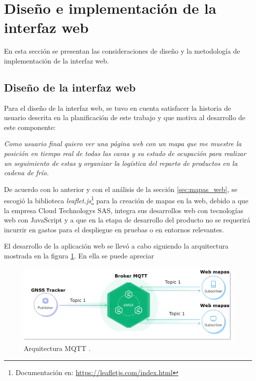 \section{Diseño e implementación de la interfaz web}

En esta sección se presentan las consideraciones de diseño y la metodología de implementación de la interfaz web.

\subsection{Diseño de la interfaz web}

Para el diseño de la interfaz web, se tuvo en cuenta satisfacer la historia de usuario descrita en la planificación de este trabajo y que motiva al desarrollo de este componente: 

\textit{Como usuario final quiero ver una página web con un mapa que me muestre la posición en tiempo real de todas las cavas y su estado de ocupación para realizar un seguimiento de estas y organizar la logística del reparto de productos en la cadena de frío.}

De acuerdo con lo anterior y con el análisis de la sección \ref{sec:mapas_web}, se escogió la biblioteca \textit{leaflet.js}\footnote{Documentación en: \url{https://leafletjs.com/index.html}} para la creación de mapas en la web, debido a que la empresa Cloud Technologys SAS, integra sus desarrollos web con tecnologías web con JavaScript y a que en la etapa de desarrollo del producto no se requerirá incurrir en gastos para el despliegue en pruebas o en entornos relevantes. 

El desarrollo de la aplicación web se llevó a cabo siguiendo la arquitectura mostrada en la figura \ref{fig:arq_mqtt}. En ella se puede apreciar 

\begin{figure}[htbp]
	\centering
	\includegraphics[width=.9\textwidth]{./Figures/arquitectura_MQTT.png}
	\caption{Arquitectura MQTT \protect\footnotemark.}
	\label{fig:arq_mqtt}
\end{figure}

